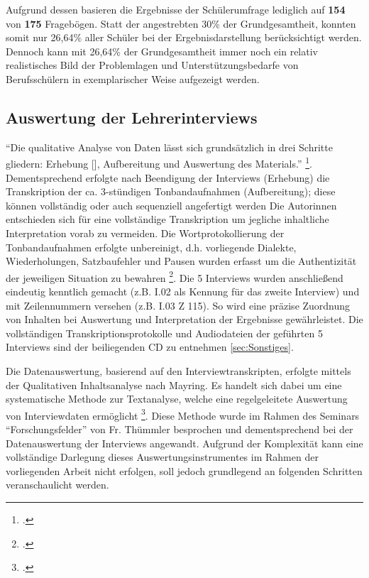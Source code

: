 Aufgrund dessen basieren die Ergebnisse der Schülerumfrage lediglich auf \textbf{154} von \textbf{175} Fragebögen. Statt der angestrebten 30\% der Grundgesamtheit, konnten somit nur 26,64\% aller Schüler bei der Ergebnisdarstellung berücksichtigt werden. Dennoch kann mit 26,64\% der Grundgesamtheit immer noch ein relativ realistisches Bild der Problemlagen und Unterstützungsbedarfe von Berufsschülern in exemplarischer Weise aufgezeigt werden.

\subsection{Auswertung der Lehrerinterviews}
\label{sec:AuswertungDerLehrerinterviews}

"`Die qualitative Analyse von Daten lässt sich grundsätzlich in drei Schritte gliedern: Erhebung [\punkte], Aufbereitung und Auswertung des Materials."' \footcite[135]{Krueger2014}. Dementsprechend erfolgte nach Beendigung der Interviews (Erhebung) die Transkription der ca. 3-stündigen Tonbandaufnahmen (Aufbereitung); diese können vollständig oder auch sequenziell angefertigt werden Die Autorinnen entschieden sich für eine vollständige Transkription um jegliche inhaltliche Interpretation vorab zu vermeiden. Die Wortprotokollierung der Tonbandaufnahmen erfolgte unbereinigt, d.h. vorliegende Dialekte, Wiederholungen, Satzbaufehler und Pausen wurden erfasst um die Authentizität der jeweiligen Situation zu bewahren \footcite[vgl.][136]{Krueger2014}. Die 5 Interviews wurden anschließend eindeutig kenntlich gemacht (z.B. I.02 als Kennung für das zweite Interview) und mit Zeilennummern versehen (z.B. I.03 Z 115). So wird eine präzise Zuordnung von Inhalten bei Auswertung und Interpretation der Ergebnisse gewährleistet. Die vollständigen Transkriptionsprotokolle und Audiodateien der geführten 5 Interviews sind der beiliegenden CD zu entnehmen \ref{sec:Sonstiges}.

Die Datenauswertung, basierend auf den Interviewtranskripten, erfolgte mittels der Qualitativen Inhaltsanalyse nach Mayring. Es handelt sich dabei um eine systematische Methode zur Textanalyse, welche eine regelgeleitete Auswertung von Interviewdaten ermöglicht \footcite[vgl.][133]{Krueger2014}. Diese Methode wurde im Rahmen des Seminars "`Forschungsfelder"' von Fr. Thümmler besprochen und dementsprechend bei der Datenauswertung der Interviews angewandt. Aufgrund der Komplexität kann eine vollständige Darlegung dieses Auswertungsinstrumentes im Rahmen der vorliegenden Arbeit nicht erfolgen, soll jedoch grundlegend an folgenden Schritten veranschaulicht werden.

